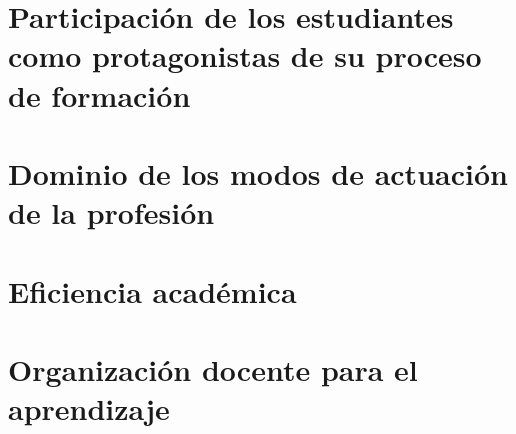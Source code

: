 \section{Participación de los estudiantes como protagonistas de su proceso de formación}



\section{Dominio de los modos de actuación de la profesión}



\section{Eficiencia académica}



\section{Organización docente para el aprendizaje }

